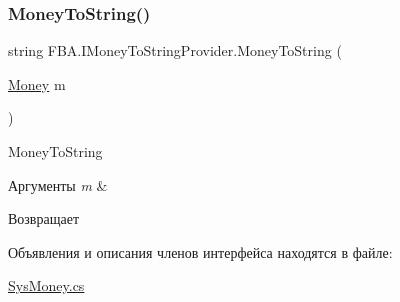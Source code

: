 \subsubsection{\texorpdfstring{Money\+To\+String()}{MoneyToString()}}
{\footnotesize\ttfamily string F\+B\+A.\+I\+Money\+To\+String\+Provider.\+Money\+To\+String (\begin{DoxyParamCaption}\item[{\mbox{\hyperlink{struct_f_b_a_1_1_money}{Money}}}]{m }\end{DoxyParamCaption})}



Money\+To\+String 


\begin{DoxyParams}{Аргументы}
{\em m} & \\
\hline
\end{DoxyParams}
\begin{DoxyReturn}{Возвращает}

\end{DoxyReturn}


Объявления и описания членов интерфейса находятся в файле\+:\begin{DoxyCompactItemize}
\item 
\mbox{\hyperlink{_sys_money_8cs}{Sys\+Money.\+cs}}\end{DoxyCompactItemize}
